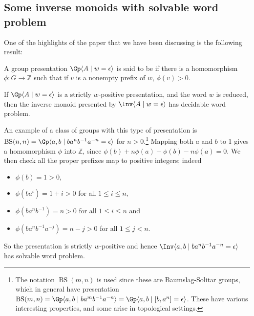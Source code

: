 \documentclass[noindex,noinsetproof,emphthm,12pt]{lmaths}
\DeclareMathOperator{\BS}{BS}
\begin{document}
\subsection{Some inverse monoids with solvable word problem}

One of the highlights of the paper \cite{Ivanov2001} that we have been discussing is the following result:
\begin{defn}
	A group presentation $\Gp \langle A \mid w = \epsilon \rangle$ is said to be  if there is a homomorphism $\phi : G \to \mathbb{Z}$ such that if $v$ is a nonempty prefix of $w$, $\phi(v) > 0$.
\end{defn}
\begin{theorem} \label{thm:strictly-w-positive-decidable-WP}
	If $\Gp \langle A \mid w = \epsilon \rangle$ is a strictly $w$-positive presentation, and the word $w$ is reduced, then the inverse monoid presented by $\Inv \langle A \mid w = \epsilon \rangle$ has decidable word problem.
\end{theorem}
An example of a class of groups with this type of presentation is $\BS(n, n) = \Gp \langle a, b \mid ba^n b^{-1} a^{-n} = \epsilon \rangle$ for $n > 0$.\footnote{The notation $\BS(m, n)$ is used since these are Baumslag-Solitar groups, which in general have presentation $\BS(m, n) = \Gp \langle a, b \mid ba^mb^{-1}a^{-n}\rangle = \Gp \langle a, b \mid [b, a^n] = \epsilon \rangle$. These have various interesting properties, and some arise in topological settings.} Mapping both $a$ and $b$ to 1 gives a homomorphism $\phi$ into $\mathbb{Z}$, since $\phi(b) + n\phi(a) - \phi(b) - n\phi(a) = 0$. We then check all the proper prefixes map to positive integers; indeed
\begin{itemize}
	\item $\phi(b) = 1 > 0$,
	\item $\phi(ba^i) = 1 + i > 0$ for all $1 \le i \le n$,
	\item $\phi(ba^nb^{-1}) = n > 0$ for all $1 \le i \le n$ and
	\item $\phi(ba^nb^{-1}a^{-j}) = n - j > 0$ for all $1 \le j < n$.
\end{itemize}
So the presentation is strictly $w$-positive and hence $\Inv \langle a, b \mid ba^nb^{-1}a^{-n} = \epsilon \rangle$ has solvable word problem.
\end{document}
